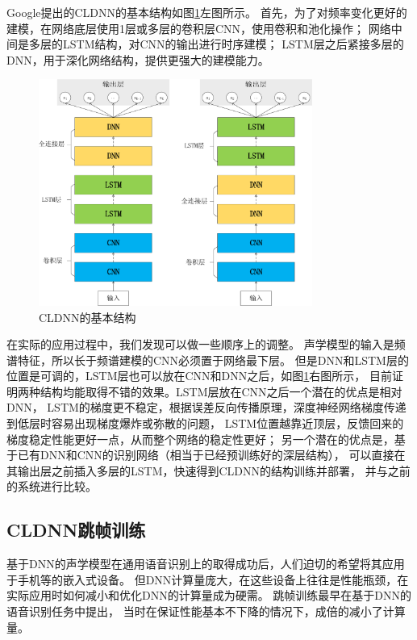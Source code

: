 Google提出的CLDNN的基本结构如图\ref{fig:cldnn}左图所示。
首先，为了对频率变化更好的建模，在网络底层使用1层或多层的卷积层CNN，使用卷积和池化操作；
网络中间是多层的LSTM结构，对CNN的输出进行时序建模；
LSTM层之后紧接多层的DNN，用于深化网络结构，提供更强大的建模能力。

\begin{figure}[htbp]
\centering
\includegraphics[width=0.8\textwidth]{figures/chapter3/cldnn-crop}
\caption{CLDNN的基本结构}
\label{fig:cldnn}
\end{figure}

在实际的应用过程中，我们发现可以做一些顺序上的调整。
声学模型的输入是频谱特征，所以长于频谱建模的CNN必须置于网络最下层。
但是DNN和LSTM层的位置是可调的，LSTM层也可以放在CNN和DNN之后，如图\ref{fig:cldnn}右图所示，
目前证明两种结构均能取得不错的效果。LSTM层放在CNN之后一个潜在的优点是相对DNN，
LSTM的梯度更不稳定，根据误差反向传播原理，深度神经网络梯度传递到低层时容易出现梯度爆炸或弥散的问题，
LSTM位置越靠近顶层，反馈回来的梯度稳定性能更好一点，从而整个网络的稳定性更好；
另一个潜在的优点是，基于已有DNN和CNN的识别网络（相当于已经预训练好的深层结构），
可以直接在其输出层之前插入多层的LSTM，快速得到CLDNN的结构训练并部署，
并与之前的系统进行比较。


\subsection{CLDNN跳帧训练}

基于DNN的声学模型在通用语音识别上的取得成功后，人们迫切的希望将其应用于手机等的嵌入式设备。
但DNN计算量庞大，在这些设备上往往是性能瓶颈，在实际应用时如何减小和优化DNN的计算量成为硬需。
跳帧训练最早在基于DNN的语音识别任务中提出，
当时在保证性能基本不下降的情况下，成倍的减小了计算量。

